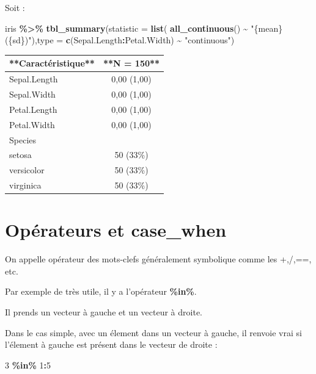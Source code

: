 \documentclass[
]{book}
\newenvironment{Shaded}{\begin{snugshade}}{\end{snugshade}}
\newcommand{\AttributeTok}[1]{\textcolor[rgb]{0.13,0.29,0.53}{#1}}
\newcommand{\DecValTok}[1]{\textcolor[rgb]{0.00,0.00,0.81}{#1}}
\newcommand{\FunctionTok}[1]{\textcolor[rgb]{0.13,0.29,0.53}{\textbf{#1}}}
\newcommand{\NormalTok}[1]{#1}
\newcommand{\SpecialCharTok}[1]{\textcolor[rgb]{0.81,0.36,0.00}{\textbf{#1}}}
\newcommand{\StringTok}[1]{\textcolor[rgb]{0.31,0.60,0.02}{#1}}
\begin{document}
Soit :

\begin{Shaded}
\begin{Highlighting}[]
\NormalTok{iris }\SpecialCharTok{\%\textgreater{}\%} \FunctionTok{tbl\_summary}\NormalTok{(}\AttributeTok{statistic =} \FunctionTok{list}\NormalTok{(}
  \FunctionTok{all\_continuous}\NormalTok{() }\SpecialCharTok{\textasciitilde{}} \StringTok{"\{mean\} (\{sd\})"}\NormalTok{),}\AttributeTok{type =} \FunctionTok{c}\NormalTok{(Sepal.Length}\SpecialCharTok{:}\NormalTok{Petal.Width) }\SpecialCharTok{\textasciitilde{}} \StringTok{"continuous"}\NormalTok{)}
\end{Highlighting}
\end{Shaded}

\begin{tabular}{l|c}
\hline
**Caractéristique** & **N = 150**\\
\hline
Sepal.Length & 0,00 (1,00)\\
\hline
Sepal.Width & 0,00 (1,00)\\
\hline
Petal.Length & 0,00 (1,00)\\
\hline
Petal.Width & 0,00 (1,00)\\
\hline
Species & \\
\hline
setosa & 50 (33\%)\\
\hline
versicolor & 50 (33\%)\\
\hline
virginica & 50 (33\%)\\
\hline
\end{tabular}

\hypertarget{opuxe9rateurs-et-case_when}{%
\section{Opérateurs et case\_when}\label{opuxe9rateurs-et-case_when}}

On appelle opérateur des mots-clefs généralement symbolique comme les +,/,==, etc.

Par exemple de très utile, il y a l'opérateur \textbf{\%in\%}.

Il prends un vecteur à gauche et un vecteur à droite.

Dans le cas simple, avec un élement dans un vecteur à gauche, il renvoie vrai si
l'élement à gauche est présent dans le vecteur de droite :

\begin{Shaded}
\begin{Highlighting}[]
\DecValTok{3} \SpecialCharTok{\%in\%} \DecValTok{1}\SpecialCharTok{:}\DecValTok{5}
\end{Highlighting}
\end{Shaded}
\end{document}
